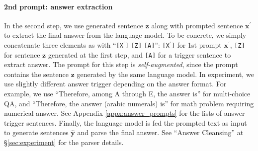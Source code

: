 \documentclass{article}
\newcommand{\CoT}{chain of thought\xspace}
\begin{document}
\paragraph{2nd prompt: answer extraction} 
In the second step, we use generated sentence $\mathbf{z}$ along with prompted sentence $\mathbf{x}^{\prime}$ to extract the final answer from the language model. 
To be concrete, we simply concatenate three elements as with ``\texttt{[X$^{\prime}$]} \texttt{[Z]} \texttt{[A]}'': \texttt{[X$^{\prime}$]} for 1st prompt $\mathbf{x}^{\prime}$, \texttt{[Z]} for sentence $\mathbf{z}$ generated at the first step, and \texttt{[A]} for a trigger sentence to extract answer. 
The prompt for this step is \textit{self-augmented}, since the prompt contains the sentence $\mathbf{z}$ generated by the same language model. In experiment, we use slightly different answer trigger depending on the answer format. 
For example, we use ``Therefore, among A through E, the answer is'' for multi-choice QA, and ``Therefore, the answer (arabic numerals) is'' for math problem requiring numerical answer. 
See Appendix \ref{appx:answer_prompts} for the lists of answer trigger sentences.
Finally, the language model is fed the prompted text as input to generate sentences $\mathbf{\hat{y}}$ and parse the final answer.
See ``Answer Cleansing'' at \S \ref{sec:experiment} for the parser details.


\end{document}

